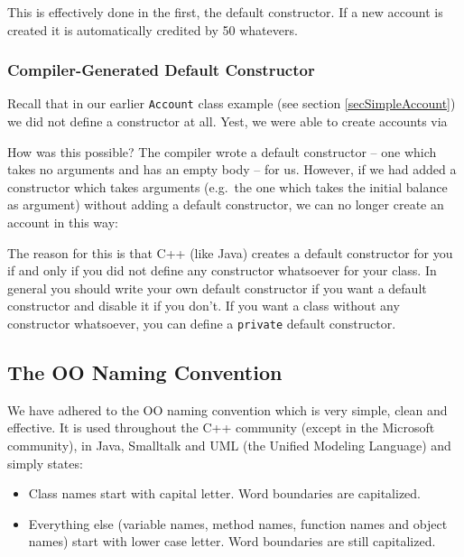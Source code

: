 This is effectively done in the first, the default constructor. If a new
account is created it is automatically credited by 50 whatevers.


\subsubsection{Compiler-Generated Default Constructor}

Recall that in our earlier \verb+Account+ class example (see section
\ref{secSimpleAccount}) we did not define a constructor at all. Yest, 
we were able to create accounts via


How was this possible? The compiler wrote a default constructor -- one
which takes no arguments and has an empty body -- for us. However, if
we had added a constructor which takes arguments (e.g.\ the one which
takes the initial balance as argument) without adding a default 
constructor, we can no longer create an account in this way:

\noindent {\small }

The reason for this is that C++ (like Java) creates a default constructor 
for you if and only if you did not define any constructor whatsoever
for your class. In general you should write your own default constructor
if you want a default constructor and disable it if you don't. If you want 
a class without any constructor whatsoever, you can define a \verb+private+
default constructor.


\subsection{The OO Naming Convention}

We have adhered to the OO naming convention which is very simple, clean
and effective. It is used throughout the C++ community (except in the
Microsoft community), in Java, Smalltalk and UML (the Unified Modeling
Language) and simply states:
\begin{itemize}
  \item Class names start with capital letter. Word boundaries are
        capitalized.
  \item Everything else (variable names, method names, function names and
        object names) start with lower case letter. Word boundaries are 
        still capitalized.
\end{itemize}

